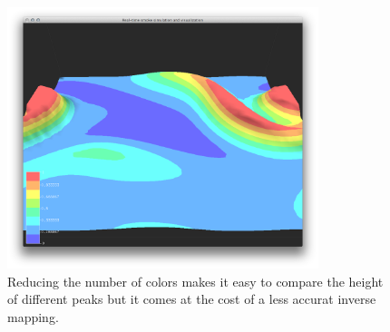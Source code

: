 \begin{figure}[htbp]
    \centering \includegraphics[height=3in]{figures/heightplot/densitydensitybanding.png}
    \caption{Reducing the number of colors makes it easy to compare the height of different peaks but it comes at the cost of a less accurat inverse mapping.}
    \label{fig:figures_heightplot_densitydensitybanding}
\end{figure}



